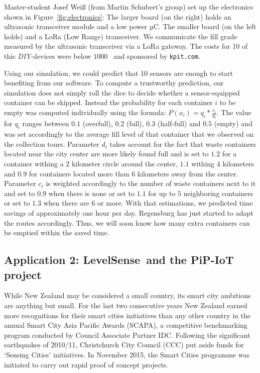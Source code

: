 \documentclass[10pt]{article}
\begin{document}
Master-student Josef Wei{\ss} (from Martin Schubert's group) set up the electronics
shown in Figure~\ref{fig:electronics}: The larger board (on the right) holds an ultrasonic transceiver module and a low power µC. The smaller board (on the left holds) and a 
LoRa (Low Range) transceiver. We communicate the fill grade measured by the 
ultrasonic transceiver via a LoRa gateway. The costs for 10 of this {\it DIY}-devices 
were below $1000$~\EUR{} and sponsored by {\tt kpit.com}.

Using our simulation, we could predict that 10 sensors are enough to start
benefiting from our software. To compute a trustworthy prediction, our simulation
does not simply roll the dice to decide whether a sensor-equipped container can
be skipped. Instead the probability for each container $i$ to be empty was 
computed individually using the formula: $P(x_i)=q_i* \frac{c_i}{d_i}$. The value for 
$q_i$ ranges between $0.1$ (overfull), $0.2$ (full), $0.3$ (half-full) and $0.5$ (empty)
and was set accordingly to the average fill level of that container that we observed on
the collection tours. Parameter $d_i$ takes account for the fact that waste containers 
located near the city center are more likely found full and is set to $1.2$ for a container
withing a $2$ kilometer circle around the center, $1.1$ withing $4$ kilometers and $0.9$ for 
containers located more than $6$ kilometers away from the center. Parameter $c_i$ is weighted 
accordingly to the number of waste containers next to it and set to $0.9$ when there is none or
set to $1.1$ for up to $5$ neighboring containers or set to $1.3$ when there are $6$ or more.
With that estimations, we predicted time savings of approximately one hour per day.
Regensburg has just started to adapt the routes accordingly. Thus, we will soon
know how many extra containers can be emptied within the saved time.

\subsection{Application 2: LevelSense\texttrademark ~and the PiP-IoT project}
\label{sec:Christchurch}

While New Zealand may be considered a small country, its smart city ambitions are anything but small. For the last two consecutive years New Zealand earned more recognitions for their smart cities initiatives than any other country in the annual Smart City Asia Pacific Awards (SCAPA), a competitive benchmarking program conducted by Council Associate Partner IDC.
Following the significant earthquakes of 2010/11, Christchurch City Council (CCC) put aside funds for ‘Sensing Cities’ initiatives. In November 2015, the Smart Cities programme was initiated to carry out rapid proof of concept projects.
\end{document}
